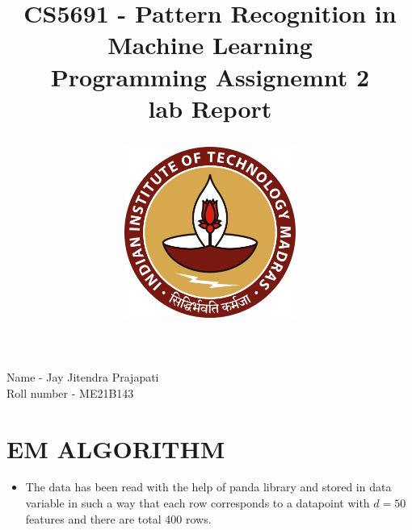 \documentclass[12pt, a4paper]{article}
\title{\textbf{\huge CS5691 - Pattern Recognition in Machine Learning}\\ 
\vspace{5mm}
\huge Programming Assignemnt 2\\
\vspace{5mm}
lab Report\\
\vspace{20mm}
\begin{figure}[h]
    \centering
    \includegraphics[width=0.5\textwidth]{IIT_Madras_Logo}
\end{figure}
}
\author{}
\date{}
\begin{document}
\maketitle %
\vfill
\begin{center}
    \huge Name - Jay Jitendra Prajapati\\
    \vspace{5mm}
    Roll number - ME21B143
\end{center}
\newpage %
\tableofcontents
\newpage
\section{EM ALGORITHM}
\begin{itemize}
    \item \large The data has been read with the help of panda library and stored in data variable in such a way that each row corresponds to a datapoint with $d=50$ features and there are total 400 rows.
\end{itemize}
\end{document}
